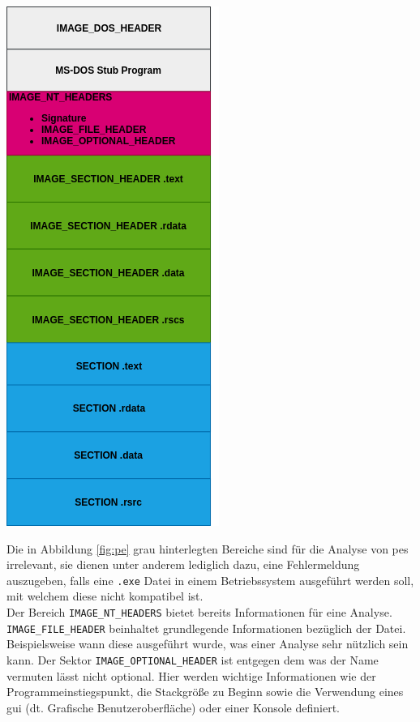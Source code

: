\documentclass[
    12pt, %
    DIV10,
    ngerman, %
    a4paper, %
    oneside, %
    titlepage, %
    parskip=half, %
    headings=normal, %
    listof=totoc, %
    bibliography=totoc, %
    index=totoc, %
    captions=tableheading, %
    final %
]{scrreprt}
\begin{document}
\begin{center}
\includegraphics[scale=0.5]{img/pe.png}
\label{fig:pe}
\end{center}
Die in Abbildung \ref{fig:pe} grau hinterlegten Bereiche sind für die Analyse von \ac{pes} irrelevant, sie dienen unter anderem lediglich dazu, eine Fehlermeldung auszugeben, falls eine \texttt{.exe} Datei in einem Betriebssystem ausgeführt werden soll, mit welchem diese nicht kompatibel ist.\\
Der Bereich \texttt{IMAGE\_NT\_HEADERS} bietet bereits Informationen für eine Analyse. \texttt{IMAGE\_FILE\_HEADER} beinhaltet grundlegende Informationen bezüglich der Datei. Beispielsweise wann diese ausgeführt wurde, was einer Analyse sehr nützlich sein kann. Der Sektor \texttt{IMAGE\_OPTIONAL\_HEADER} ist entgegen dem was der Name vermuten lässt nicht optional. Hier werden wichtige Informationen wie der Programmeinstiegspunkt, die Stackgröße zu Beginn sowie die Verwendung eines \ac{gui} (dt. Grafische Benutzeroberfläche) oder einer Konsole definiert.\\
\end{document}
